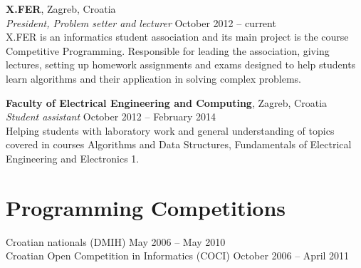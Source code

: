 \documentclass[margin,line]{resume}
\begin{document}
\begin{resume}
\textbf{X.FER}, Zagreb, Croatia \vspace{2mm}\\\vspace{1mm}%
\textsl{President, Problem setter and lecturer} \hfill October 2012 -- current\\%
X.FER is an informatics student association and its main project is the course Competitive Programming. Responsible for leading the association, giving lectures, setting up homework assignments and exams designed to help students learn algorithms and their application in solving complex problems.


\textbf{Faculty of Electrical Engineering and Computing}, Zagreb, Croatia \vspace{2mm}\\\vspace{1mm}%
\textsl{Student assistant} \hfill October 2012 -- February 2014\\%
Helping students with laboratory work and general understanding of topics covered in courses Algorithms  and  Data  Structures,
Fundamentals  of  Electrical  Engineering and  Electronics  1.



\vspace{1mm}
\section{\mysidestyle Programming Competitions} 

Croatian nationals (DMIH) \hfill May 2006 -- May 2010\\%
Croatian Open Competition in Informatics (COCI) \hfill October 2006 -- April 2011\\%


\end{resume}
\end{document}

